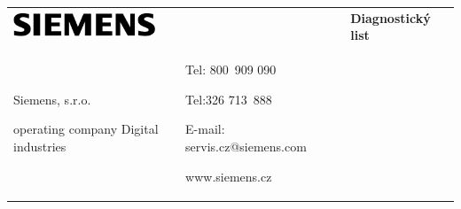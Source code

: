 \documentclass{article}
\title{}
\author{}
\date{2024-09-27}
\begin{document}
\begin{flushleft}
\tablefirsthead{}
\tablehead{}
\tabletail{}
\tablelasttail{}
\begin{supertabular}{m{6.714cm}m{4.695cm}m{9.193cm}}
 &
\Huge \textbf{Diagnostický list}\\
\footnotesize Siemens,  s.r.o.

operating company Digital industries

 &
\footnotesize Tel: 800~909 090

Tel:326 713~888

E-mail: servis.cz@siemens.com

www.siemens.cz &
\\
\end{supertabular}
\end{flushleft}
\end{document}

